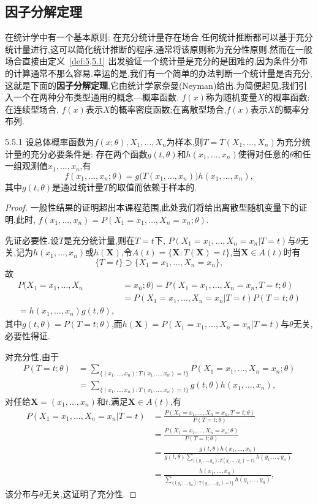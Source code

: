 \subsection{因子分解定理\label{ssec:5.5.2}}
在统计学中有一个基本原则: 在充分统计量存在场合,任何统计推断都可以基于充分统计量进行,这可以简化统计推断的程序,通常将该原则称为充分性原则.然而在一般场合直接由定义~\ref{def:5,5.1} 出发验证一个统计量是充分的是困难的,因为条件分布的计算通常不那么容易.幸运的是,我们有一个简单的办法判断一个统计量是否充分,这就是下面的\textbf{因子分解定理},它由统计学家奈曼(Neyman)给出.为简便起见,我们引入一个在两种分布类型通用的概念—概率函数. $f(x)$称为随机变量$X$的概率函数: 在连续型场合, $f(x)$表示$X$的概率密度函数;在离散型场合,$f(x)$表示$X$的概率分布列.
\begin{theorem}{}{5.5.1}
设总体概率函数为$f(x;\theta),X_1,\dotsc,X_n$为样本,则$T=T(X_1,\dotsc,X_n)$为充分统计量的充分必要条件是: 存在两个函数$g(t,\theta)$和$h(x_1,\dotsc,x_n)$使得对任意的$\theta$和任一组观测值$x_1,\dotsc,x_n$,有
\begin{equation}\label{eq:5.5.1}
f(x_1,\dotsc,x_n;\theta)=g\big(T(x_1,\dotsc,x_n)\big)h(x_1,\dotsc,x_n),
\end{equation}
其中$g(t,\theta)$是通过统计量$T$的取值而依赖于样本的.
\end{theorem}
\begin{proof}
一般性结果的证明超出本课程范围,此处我们将给出离散型随机变量下的证明,此时, $f(x_1,\dotsc,x_n)=P(X_1=x_1,\dotsc,X_n=x_n;\theta)$.

先证必要性.设$T$是充分统计量,则在$T=t$下, $P(X_1=x_1,\dotsc,X_n=x_n|T=t)$与$\theta$无关,记为$h(x_1,\dotsc,x_n)$或$h(\bm X)$,令$A(t)=\{\bm X:T(\bm X)=t\}$,当$\bm X\in A(t)$时有
\[\{T=t\}\supset\{X_1=x_1,\dotsc,X_n=x_n\},\]
故
\begin{align*}
P(X_1=x_1,\dotsc,X_n&=x_n;\theta)=P(X_1=x_1,\dotsc,X_n=x_n,T=t;\theta)\\
&=P(X_1=x_1,\dotsc,X_n=x_n|T=t)P(T=t;\theta)\\
=h(x_1,\dotsc,x_n)g(t,\theta),
\end{align*}
其中$g(t,\theta)=P(T=t;\theta)$,而$h(\bm X)=P(X_1=x_1,\dotsc,X_n=x_n|T=t)$与$\theta$无关,必要性得证.

对充分性,由于
\begin{align*}
P(T=t;\theta)&=\sum_{\{(x_1,\dotsc,x_n):T(x_1,\dotsc,x_n)=t\}}P(X_1=x_1,\dotsc,X_n=x_n;\theta)\\
&=\sum_{\{(x_1,\dotsc,x_n):T(x_1,\dotsc,x_n)=t\}}g(t,\theta)h(x_1,\dotsc,x_n),
\end{align*}
对任给$\bm X=(x_1,\dotsc,x_n)$和$t$,满足$\bm X\in A(t)$,有
\begin{align*}
P(X_1=x_1,\dotsc,X_n=x_n|T=t)&=\frac{P(X_1=x_1,\dotsc,X_n=x_n,T=t;\theta)}{P(T=t;\theta)}\\
&=\frac{P(X_1=x_1,\dotsc,X_n=x_n;\theta)}{P(T=t;\theta)}\\
&=\frac{g(t,\theta)h(x_1,\dotsc,x_n)}{g(t,\theta)\sum_{\{(y_1,\dotsc,y_n):
T(y_1,\dotsc,y_n)=t\}}h(y_1,\dotsc,y_n)}\\
&=\frac{h(x_1,\dotsc,x_n)}{\sum_{\{(y_1,\dotsc,y_n):T(y_1,\dotsc,y_n)=t\}}h(y_1,\dotsc,y_n)},
\end{align*}
该分布与$\theta$无关,这证明了充分性.
\end{proof}

